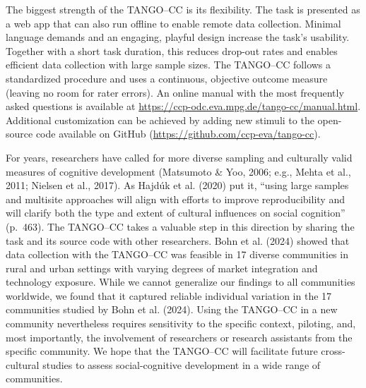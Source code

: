 \documentclass[
  man,floatsintext]{apa7}
\begin{document}
The biggest strength of the TANGO--CC is its flexibility.
The task is presented as a web app that can also run offline to enable remote data collection.
Minimal language demands and an engaging, playful design increase the task's usability.
Together with a short task duration, this reduces drop-out rates and enables efficient data collection with large sample sizes.
The TANGO--CC follows a standardized procedure and uses a continuous, objective outcome measure (leaving no room for rater errors).
An online manual with the most frequently asked questions is available at \url{https://ccp-odc.eva.mpg.de/tango-cc/manual.html}.
Additional customization can be achieved by adding new stimuli to the open-source code available on GitHub (\url{https://github.com/ccp-eva/tango-cc}).

For years, researchers have called for more diverse sampling and culturally valid measures of cognitive development (Matsumoto \& Yoo, 2006; e.g., Mehta et al., 2011; Nielsen et al., 2017).
As Hajdúk et al. (2020) put it, ``using large samples and multisite approaches will align with efforts to improve reproducibility and will clarify both the type and extent of cultural influences on social cognition'' (p.~463).
The TANGO--CC takes a valuable step in this direction by sharing the task and its source code with other researchers.
Bohn et al. (2024) showed that data collection with the TANGO--CC was feasible in 17 diverse communities in rural and urban settings with varying degrees of market integration and technology exposure.
While we cannot generalize our findings to all communities worldwide, we found that it captured reliable individual variation in the 17 communities studied by Bohn et al. (2024).
Using the TANGO--CC in a new community nevertheless requires sensitivity to the specific context, piloting, and, most importantly, the involvement of researchers or research assistants from the specific community.
We hope that the TANGO--CC will facilitate future cross-cultural studies to assess social-cognitive development in a wide range of communities.
\end{document}
